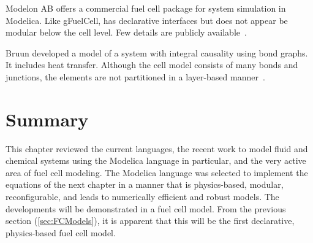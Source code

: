 Modelon AB offers a commercial fuel cell package for system simulation in Modelica.  Like gFuelCell, has declarative interfaces but does not appear be modular below the cell level.  Few details are publicly available~\cite{ModelonFC}.

Bruun developed a model of a  system with integral causality using bond graphs.  It includes heat transfer.  Although the cell model consists of many bonds and junctions, the elements are not partitioned in a layer-based manner~\cite{Bruun2009}.



\section{Summary}

This chapter reviewed the current  languages, the recent work to model fluid and chemical systems using the Modelica language in particular, and the very active area of fuel cell modeling.  The Modelica language was selected to implement the equations of the next chapter in a manner that is physics-based, modular, reconfigurable, and leads to numerically efficient and robust models.  The developments will be demonstrated in a fuel cell model.  From the previous section (\ref{sec:FCModels}), it is apparent that this will be the first declarative, physics-based fuel cell model.


